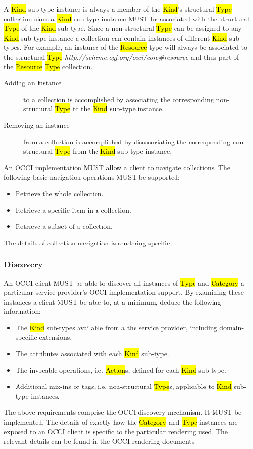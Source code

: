 \documentclass[10pt,a4paper,british]{article}
\begin{document}
A \hl{Kind} sub-type instance is always a member of the \hl{Kind}'s structural
\hl{Type} collection since a \hl{Kind} sub-type instance MUST be associated
with the structural \hl{Type} of the \hl{Kind} sub-type.
Since a non-structural \hl{Type} can be assigned to any \hl{Kind} sub-type
instance a collection can contain instances of different \hl{Kind} sub-types.
%
For example, an instance of the \hl{Resource} type will always be associated
to the structural \hl{Type}
\textit{http://scheme.ogf.org/occi/core\#resource} and thus part of the
\hl{Resource} \hl{Type} collection.
\begin{description}
\item[Adding an instance] to a collection is accomplished by associating the
corresponding non-structural \hl{Type} to the \hl{Kind} sub-type instance.
\item[Removing an instance] from a collection is accomplished by disassociating the
corresponding non-structural \hl{Type} from the \hl{Kind} sub-type instance.
\end{description}
%
An OCCI implementation MUST allow a client to navigate collections. The
following basic navigation operations MUST be supported:
\begin{itemize}
\item Retrieve the whole collection.
\item Retrieve a specific item in a collection.
\item Retrieve a subset of a collection.
\end{itemize}
The details of collection navigation is rendering specific.

\subsubsection{Discovery}
\label{sec:discovery}
An OCCI client MUST be able to discover all instances of \hl{Type} and
\hl{Category} a particular service provider's OCCI implementation support. By
examining these instances a client MUST be able to, at a minimum, deduce the
following information:
\begin{itemize}
\item The \hl{Kind} sub-types available from a the service provider, including domain-specific extensions.
\item The attributes associated with each \hl{Kind} sub-type.
\item The invocable operations, i.e. \hl{Action}s, defined for each \hl{Kind} sub-type.
\item Additional mix-ins or tags, i.e. non-structural \hl{Type}s, applicable to
 \hl{Kind} sub-type instances.
\end{itemize}
The above requirements comprise the OCCI discovery mechanism. It MUST be
implemented.
%
The details of exactly how the \hl{Category} and \hl{Type} instances are
exposed to an OCCI client is specific to the particular rendering used.
The relevant details can be found in the OCCI rendering documents.
\end{document}
